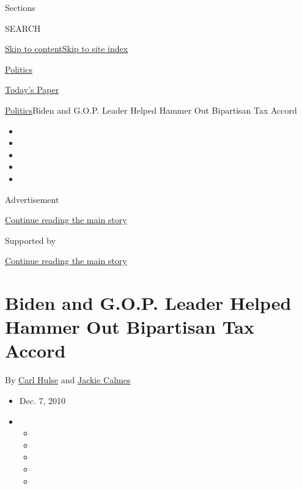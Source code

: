 Sections

SEARCH

\protect\hyperlink{site-content}{Skip to
content}\protect\hyperlink{site-index}{Skip to site index}

\href{https://www.nytimes3xbfgragh.onion/section/politics}{Politics}

\href{https://myaccount.nytimes3xbfgragh.onion/auth/login?response_type=cookie\&client_id=vi}{}

\href{https://www.nytimes3xbfgragh.onion/section/todayspaper}{Today's
Paper}

\href{/section/politics}{Politics}\textbar{}Biden and G.O.P. Leader
Helped Hammer Out Bipartisan Tax Accord

\begin{itemize}
\item
\item
\item
\item
\item
\end{itemize}

Advertisement

\protect\hyperlink{after-top}{Continue reading the main story}

Supported by

\protect\hyperlink{after-sponsor}{Continue reading the main story}

\hypertarget{biden-and-gop-leader-helped-hammer-out-bipartisan-tax-accord}{%
\section{Biden and G.O.P. Leader Helped Hammer Out Bipartisan Tax
Accord}\label{biden-and-gop-leader-helped-hammer-out-bipartisan-tax-accord}}

By \href{https://www.nytimes3xbfgragh.onion/by/carl-hulse}{Carl Hulse}
and \href{https://www.nytimes3xbfgragh.onion/by/jackie-calmes}{Jackie
Calmes}

\begin{itemize}
\item
  Dec. 7, 2010
\item
  \begin{itemize}
  \item
  \item
  \item
  \item
  \item
  \end{itemize}
\end{itemize}


